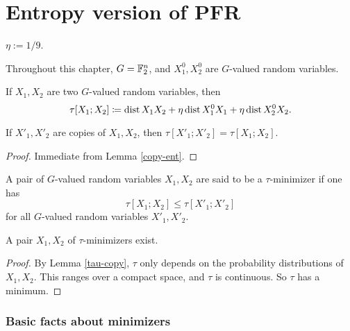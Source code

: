 \chapter{Entropy version of PFR}

\begin{definition}\label{eta-def}
 \leanok
  $\eta := 1/9$.
\end{definition}

Throughout this chapter,  $G = \mathbb{F}_2^n$, and $X^0_1, X^0_2$ are $G$-valued random variables.

\begin{definition}\label{tau-def}
If $X_1,X_2$ are two $G$-valued random variables, then
$$  \tau[X_1; X_2] \coloneqq \operatorname{dist}{X_1}{X_2} + \eta  \operatorname{dist}{X^0_1}{X_1} + \eta \operatorname{dist}{X^0_2}{X_2}.$$
\end{definition}

\begin{lemma}\label{tau-copy}
    If $X'_1, X'_2$ are copies of $X_1,X_2$, then $\tau[X'_1;X'_2] = \tau[X_1;X_2]$.
\end{lemma}


\begin{proof} Immediate from Lemma \ref{copy-ent}.
\end{proof}

\begin{definition}\label{tau-min-def}
A pair of $G$-valued random variables $X_1, X_2$ are said to be a $\tau$-minimizer if one has
  $$\tau[X_1;X_2] \leq \tau[X'_1;X'_2]
  $$
for all $G$-valued random variables $X'_1, X'_2$.
\end{definition}


\begin{proposition}\label{tau-min}
A pair $X_1, X_2$ of $\tau$-minimizers exist.
\end{proposition}

\begin{proof} By Lemma \ref{tau-copy}, $\tau$ only depends on the probability distributions of $X_1, X_2$. This ranges over a compact space, and $\tau$ is continuous.  So $\tau$ has a minimum.
\end{proof}

\subsection{Basic facts about minimizers}

